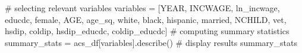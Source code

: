 \documentclass[
  letterpaper,
  DIV=11,
  numbers=noendperiod]{scrartcl}
\newenvironment{Shaded}{\begin{snugshade}}{\end{snugshade}}
\newcommand{\CommentTok}[1]{\textcolor[rgb]{0.37,0.37,0.37}{#1}}
\newcommand{\NormalTok}[1]{\textcolor[rgb]{0.00,0.23,0.31}{#1}}
\newcommand{\OperatorTok}[1]{\textcolor[rgb]{0.37,0.37,0.37}{#1}}
\newcommand{\StringTok}[1]{\textcolor[rgb]{0.13,0.47,0.30}{#1}}
\begin{document}
\begin{Shaded}
\begin{Highlighting}[]
\CommentTok{\# selecting relevant variables}
\NormalTok{variables }\OperatorTok{=}\NormalTok{ [}\StringTok{\textquotesingle{}YEAR\textquotesingle{}}\NormalTok{, }\StringTok{\textquotesingle{}INCWAGE\textquotesingle{}}\NormalTok{, }\StringTok{\textquotesingle{}ln\_incwage\textquotesingle{}}\NormalTok{, }\StringTok{\textquotesingle{}educdc\textquotesingle{}}\NormalTok{, }\StringTok{\textquotesingle{}female\textquotesingle{}}\NormalTok{, }\StringTok{\textquotesingle{}AGE\textquotesingle{}}\NormalTok{, }\StringTok{\textquotesingle{}age\_sq\textquotesingle{}}\NormalTok{,}
             \StringTok{\textquotesingle{}white\textquotesingle{}}\NormalTok{, }\StringTok{\textquotesingle{}black\textquotesingle{}}\NormalTok{, }\StringTok{\textquotesingle{}hispanic\textquotesingle{}}\NormalTok{, }\StringTok{\textquotesingle{}married\textquotesingle{}}\NormalTok{, }\StringTok{\textquotesingle{}NCHILD\textquotesingle{}}\NormalTok{, }\StringTok{\textquotesingle{}vet\textquotesingle{}}\NormalTok{, }\StringTok{\textquotesingle{}hsdip\textquotesingle{}}\NormalTok{, }\StringTok{\textquotesingle{}coldip\textquotesingle{}}\NormalTok{,}
             \StringTok{\textquotesingle{}hsdip\_educdc\textquotesingle{}}\NormalTok{, }\StringTok{\textquotesingle{}coldip\_educdc\textquotesingle{}}\NormalTok{]}
\CommentTok{\# computing summary statistics}
\NormalTok{summary\_stats }\OperatorTok{=}\NormalTok{ acs\_df[variables].describe()}
\CommentTok{\# display results}
\NormalTok{summary\_stats}
\end{Highlighting}
\end{Shaded}
\end{document}
